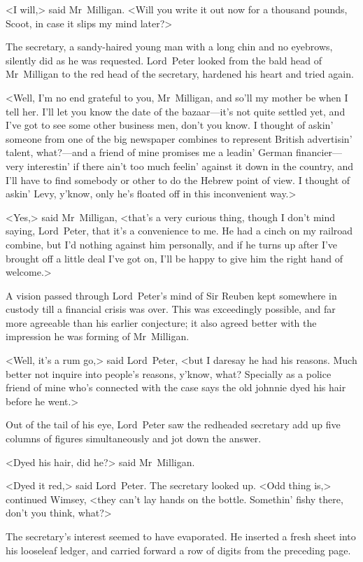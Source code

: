 <I will,> said Mr~Milligan. <Will you write it out now for a thousand pounds, Scoot, in case it slips my mind later?>

The secretary, a sandy-haired young man with a long chin and no eyebrows, silently did as he was requested. Lord~Peter looked from the bald head of Mr~Milligan to the red head of the secretary, hardened his heart and tried again.

<Well, I'm no end grateful to you, Mr~Milligan, and so'll my mother be when I tell her. I'll let you know the date of the bazaar—it's not quite settled yet, and I've got to see some other business men, don't you know. I thought of askin' someone from one of the big newspaper combines to represent British advertisin' talent, what?—and a friend of mine promises me a leadin' German financier—very interestin' if there ain't too much feelin' against it down in the country, and I'll have to find somebody or other to do the Hebrew point of view. I thought of askin' Levy, y'know, only he's floated off in this inconvenient way.>

<Yes,> said Mr~Milligan, <that's a very curious thing, though I don't mind saying, Lord~Peter, that it's a convenience to me. He had a cinch on my railroad combine, but I'd nothing against him personally, and if he turns up after I've brought off a little deal I've got on, I'll be happy to give him the right hand of welcome.>

A vision passed through Lord~Peter's mind of Sir Reuben kept somewhere in custody till a financial crisis was over. This was exceedingly possible, and far more agreeable than his earlier conjecture; it also agreed better with the impression he was forming of Mr~Milligan.

<Well, it's a rum go,> said Lord~Peter, <but I daresay he had his reasons. Much better not inquire into people's reasons, y'know, what? Specially as a police friend of mine who's connected with the case says the old johnnie dyed his hair before he went.>

Out of the tail of his eye, Lord~Peter saw the redheaded secretary add up five columns of figures simultaneously and jot down the answer.

<Dyed his hair, did he?> said Mr~Milligan.

<Dyed it red,> said Lord~Peter. The secretary looked up. <Odd thing is,> continued Wimsey, <they can't lay hands on the bottle. Somethin' fishy there, don't you think, what?>

The secretary's interest seemed to have evaporated. He inserted a fresh sheet into his looseleaf ledger, and carried forward a row of digits from the preceding page.

